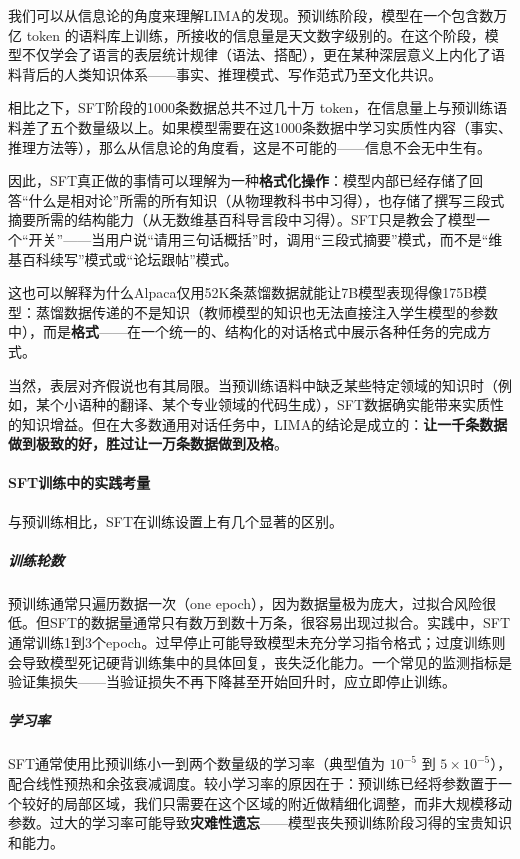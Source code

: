 \begin{framed}{}
    我们可以从信息论的角度来理解LIMA的发现。预训练阶段，模型在一个包含数万亿 token 的语料库上训练，所接收的信息量是天文数字级别的。在这个阶段，模型不仅学会了语言的表层统计规律（语法、搭配），更在某种深层意义上内化了语料背后的人类知识体系——事实、推理模式、写作范式乃至文化共识。

    相比之下，SFT阶段的1000条数据总共不过几十万 token，在信息量上与预训练语料差了五个数量级以上。如果模型需要在这1000条数据中学习实质性内容（事实、推理方法等），那么从信息论的角度看，这是不可能的——信息不会无中生有。

    因此，SFT真正做的事情可以理解为一种\textbf{格式化操作}：模型内部已经存储了回答“什么是相对论”所需的所有知识（从物理教科书中习得），也存储了撰写三段式摘要所需的结构能力（从无数维基百科导言段中习得）。SFT只是教会了模型一个“开关”——当用户说“请用三句话概括”时，调用“三段式摘要”模式，而不是“维基百科续写”模式或“论坛跟帖”模式。

    这也可以解释为什么Alpaca仅用52K条蒸馏数据就能让7B模型表现得像175B模型：蒸馏数据传递的不是知识（教师模型的知识也无法直接注入学生模型的参数中），而是\textbf{格式}——在一个统一的、结构化的对话格式中展示各种任务的完成方式。

    当然，表层对齐假说也有其局限。当预训练语料中缺乏某些特定领域的知识时（例如，某个小语种的翻译、某个专业领域的代码生成），SFT数据确实能带来实质性的知识增益。但在大多数通用对话任务中，LIMA的结论是成立的：\textbf{让一千条数据做到极致的好，胜过让一万条数据做到及格}。
\end{framed}

\paragraph{SFT训练中的实践考量}

与预训练相比，SFT在训练设置上有几个显著的区别。

\subparagraph{训练轮数} 预训练通常只遍历数据一次（one epoch），因为数据量极为庞大，过拟合风险很低。但SFT的数据量通常只有数万到数十万条，很容易出现过拟合。实践中，SFT通常训练1到3个epoch。过早停止可能导致模型未充分学习指令格式；过度训练则会导致模型死记硬背训练集中的具体回复，丧失泛化能力。一个常见的监测指标是验证集损失——当验证损失不再下降甚至开始回升时，应立即停止训练。

\subparagraph{学习率} SFT通常使用比预训练小一到两个数量级的学习率（典型值为 $10^{-5}$ 到 $5\times 10^{-5}$），配合线性预热和余弦衰减调度。较小学习率的原因在于：预训练已经将参数置于一个较好的局部区域，我们只需要在这个区域的附近做精细化调整，而非大规模移动参数。过大的学习率可能导致\textbf{灾难性遗忘}——模型丧失预训练阶段习得的宝贵知识和能力。

